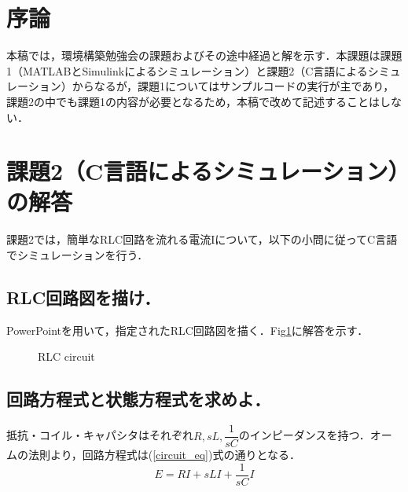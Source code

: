 \documentclass[a4paper,10pt,twocolumn,fleqn]{jarticle}
\begin{document}
{}

\section{序論}
  本稿では，環境構築勉強会の課題およびその途中経過と解を示す．本課題は課題1（MATLABとSimulinkによるシミュレーション）と課題2（C言語によるシミュレーション）からなるが，課題1についてはサンプルコードの実行が主であり，課題2の中でも課題1の内容が必要となるため，本稿で改めて記述することはしない．

\section{課題2（C言語によるシミュレーション）の解答}
  課題2では，簡単なRLC回路を流れる電流Iについて，以下の小問に従ってC言語でシミュレーションを行う．

  \subsection{RLC回路図を描け．}
    PowerPoint\textregistered を用いて，指定されたRLC回路図を描く．Fig\ref{RLC_circuit}に解答を示す．

    \begin{figure}[htbp]
      \begin{center}
        \caption{RLC circuit}
        \label{RLC_circuit}
      \end{center}
    \end{figure}

  \subsection{回路方程式と状態方程式を求めよ．}
    抵抗・コイル・キャパシタはそれぞれ$R, sL, \dfrac{1}{sC}$のインピーダンスを持つ．オームの法則より，回路方程式は(\ref{circuit_eq})式の通りとなる．
    \begin{equation}
      \label{circuit_eq}
      E = RI + sLI + \frac{1}{sC} I
    \end{equation}
\end{document}
